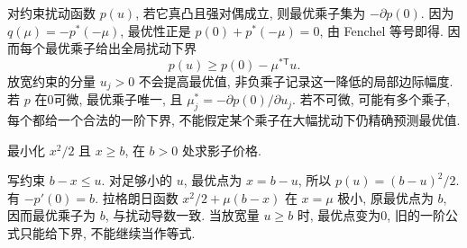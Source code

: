 对约束扰动函数 $p(u)$, 若它真凸且强对偶成立, 则最优乘子集为 $-\partial p(0)$. 因为 $q(\mu)=-p^*(-\mu)$, 最优性正是 $p(0)+p^*(-\mu)=0$, 由 Fenchel 等号即得. 因而每个最优乘子给出全局扰动下界
\[
p(u)\ge p(0)-\mu^{*\mathsf T}u.
\]
放宽约束的分量 $u_j>0$ 不会提高最优值, 非负乘子记录这一降低的局部边际幅度. 若 $p$ 在0可微, 最优乘子唯一, 且 $\mu_j^*=-\partial p(0)/\partial u_j$. 若不可微, 可能有多个乘子, 每个都给一个合法的一阶下界, 不能假定某个乘子在大幅扰动下仍精确预测最优值.

\begin{example}
最小化 $x^2/2$ 且 $x\ge b$, 在 $b>0$ 处求影子价格.
\end{example}
\begin{solution}
写约束 $b-x\le u$. 对足够小的 $u$, 最优点为 $x=b-u$, 所以 $p(u)=(b-u)^2/2$. 有 $-p'(0)=b$. 拉格朗日函数 $x^2/2+\mu(b-x)$ 在 $x=\mu$ 极小, 原最优点为 $b$, 因而最优乘子为 $b$, 与扰动导数一致. 当放宽量 $u\ge b$ 时, 最优点变为0, 旧的一阶公式只能给下界, 不能继续当作等式.
\end{solution}
